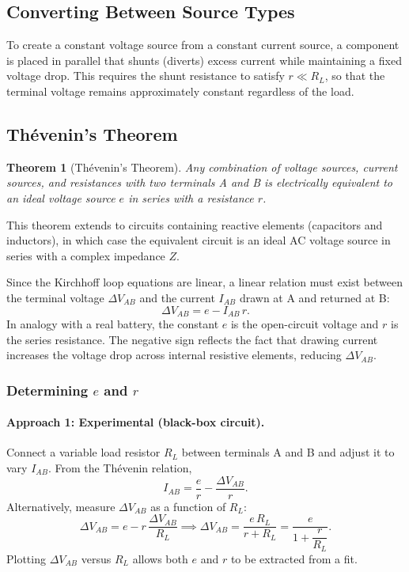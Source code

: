 \documentclass{article}
\newtheorem{theorem}{Theorem}
\begin{document}
\subsection{Converting Between Source Types}

To create a constant voltage source from a constant current source, a component is placed in parallel that shunts (diverts) excess current while maintaining a fixed voltage drop. This requires the shunt resistance to satisfy $r \ll R_L$, so that the terminal voltage remains approximately constant regardless of the load.

\subsection{Thévenin's Theorem}

\begin{theorem}[Thévenin's Theorem]
    Any combination of voltage sources, current sources, and resistances with two terminals A and B is electrically equivalent to an ideal voltage source $e$ in series with a resistance $r$.
\end{theorem}

This theorem extends to circuits containing reactive elements (capacitors and inductors), in which case the equivalent circuit is an ideal AC voltage source in series with a complex impedance $Z$.

Since the Kirchhoff loop equations are linear, a linear relation must exist between the terminal voltage $\Delta V_{AB}$ and the current $I_{AB}$ drawn at A and returned at B:
\[\Delta V_{AB} = e - I_{AB}\,r.\]
In analogy with a real battery, the constant $e$ is the open-circuit voltage and $r$ is the series resistance. The negative sign reflects the fact that drawing current increases the voltage drop across internal resistive elements, reducing $\Delta V_{AB}$.

\subsubsection{Determining $e$ and $r$}

\paragraph{Approach 1: Experimental (black-box circuit).}
Connect a variable load resistor $R_L$ between terminals A and B and adjust it to vary $I_{AB}$. From the Thévenin relation,
\[I_{AB} = \frac{e}{r} - \frac{\Delta V_{AB}}{r}.\]
Alternatively, measure $\Delta V_{AB}$ as a function of $R_L$:
\[\Delta V_{AB} = e - r\,\frac{\Delta V_{AB}}{R_L} \implies \Delta V_{AB} = \frac{e\,R_L}{r + R_L} = \frac{e}{1 + \dfrac{r}{R_L}}.\]
Plotting $\Delta V_{AB}$ versus $R_L$ allows both $e$ and $r$ to be extracted from a fit.
\end{document}
